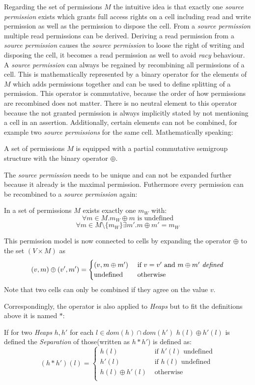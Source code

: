 	Regarding the set of permissions $M$ the intuitive idea is that
	exactly one \emph{source permission} exists which grants full access rights
	on a cell including read and write permission as well as the permission to
	dispose the cell. From a \emph{source permission} multiple read permissions
	can be derived. Deriving a read permission from a \emph{source permission}
	causes the \emph{source permission} to loose the right of writing and
	disposing the cell, it becomes a read permission as well to avoid \emph{racy}
	behaviour. A \emph{source permission} can always be regained by recombining
	all permissions of a cell.
	This is mathematically represented by a binary operator for the elements of
	$M$ which adds permissions together and can be used to
	define splitting of a permission. This operator is commutative, because the
	order of how permissions are recombined does not matter. There is no neutral
	element to this operator because the not granted permission is always
	implicitly stated by not mentioning a cell in an assertion.
	Additionally, certain elements can not be combined, for example two
	\emph{source permissions} for the same cell. Mathematically speaking:
	\begin{mydef}[Permission]
		A set of permissions $M$ is equipped with a partial commutative
		semigroup structure with the binary operator $\oplus$.
	\end{mydef}
	The \emph{source permission} needs to be unique and can not be expanded
	further because it already is the maximal permission. Futhermore every
	permission can be recombined to a \emph{source permission} again:
	\begin{mydef}
		In a set of permissions $M$ exists exactly one $m_W$ with:
		$$\forall m\in M.m_W\oplus m\text{ is undefined}$$
		$$\forall m\in M\setminus \{m_W\} \exists m'. m \oplus m' = m_W$$
	\end{mydef}
	This permission model is now connected to cells by expanding the operator
	$\oplus$ to the set $(V\times M)$ as
	$$(v,m)\oplus(v',m') =
		\begin{cases}
			(v,m\oplus m') &\text{ if $v=v'$ and $m\oplus m'$ \textit{defined}}\\
			\text{undefined} &\text{ otherwise}\\
		\end{cases}
	$$
	Note that two cells can only be combined if they agree on the value $v$.

	Correspondingly, the operator is also applied to \emph{Heaps} but to fit
	the definitions above it is named $\ast$:
	\begin{mydef}
		If for two \emph{Heaps} $h,h'$ for each $l\in \textit{dom}(h)\cap\textit{dom}(h')$ $h(l)\oplus h'(l)$
		is defined the \emph{Separation} of those(written as $h\ast h'$)
		is defined as:
		$$(h\ast h')(l) =
			\begin{cases}
				h(l) &\text{ if $h'(l)$ undefined}\\
				h'(l)&\text{ if $h(l)$ undefined}\\
				h(l) \oplus h'(l) &\text{ otherwise}\\
			\end{cases}
		$$
	\end{mydef}

